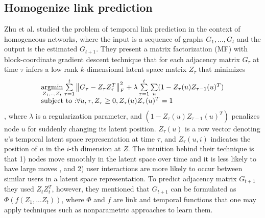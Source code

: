 
\subsection{Homogenize link prediction}

Zhu et al. \cite{Zhu2016} studied the problem of temporal link prediction in the context of homogeneous networks, where the input is a sequence of graphs $G_1, ..., G_t$ and the output is the estimated $G_{t+1}$. They present a matrix factorization (MF) with block-coordinate gradient descent technique that for each adjacency matrix $G_\tau$ at time $\tau$ infers a low rank $k$-dimensional latent space matrix $Z_\tau$ that minimizes %
\begin{equation}\label{latentOrigEqu}
    \begin{array}{l}
\operatorname*{argmin}\limits_{Z_1, .., Z_t}\sum\limits_{\tau=1}^{t}\left \| G_\tau-Z_{\tau}Z_{\tau}^T \right \|^2_F+\lambda \sum\limits_{\tau=1}^{t}\sum\limits_{u}(1-Z_{\tau}(u)Z_{\tau-1}(u)^T) 
\\
\text{subject to :} \forall u,\tau,Z_{\tau}\geq 0, Z_{\tau}(u)Z_{\tau}(u)^T=1
    \end{array}
\end{equation}
, where $\lambda$ is a regularization parameter, and  $(1-Z_{\tau}(u)Z_{\tau-1}(u)^T)$ penalizes node $u$ for suddenly changing its latent position. %
$Z_\tau(u)$ is a row vector denoting $u$'s temporal latent space representation at time $\tau$, and $Z_\tau(u,i)$ indicates the position of $u$ in the $i$-th dimension at $Z$. The intuition behind their technique is that 1) nodes move smoothly in the latent space over time and it is less likely to have large moves \cite{sarkar2005dynamic,zhang2014inferring}, and 2) user interactions are more likely to occur between similar users in a latent space representation. To predict adjacency matrix $G_{t+1}$ they used $Z_tZ_t^T$, however, they mentioned that $G_{t+1}$ can be formulated as $\Phi(f(Z_1,...Z_t))$, where $\Phi$ and $f$ are link and temporal functions that one may apply techniques such as nonparametric approaches \cite{Sarkar:2012} to learn them.

